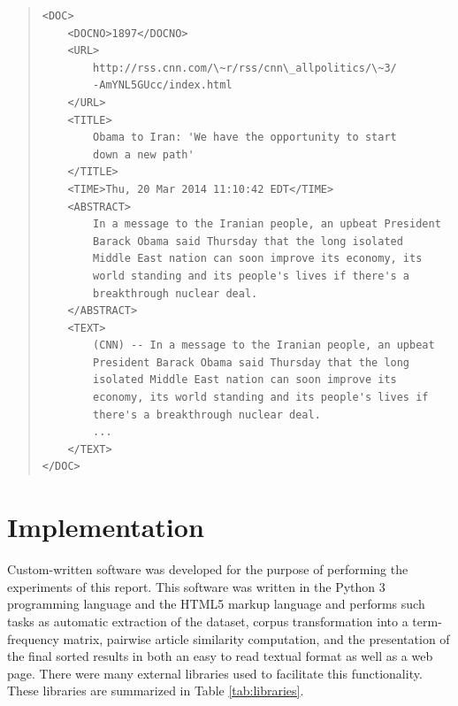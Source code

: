 \documentclass[11pt]{article}
\begin{document}
\small 
\begin{quote} \label{samplearticle}
\begin{verbatim}
<DOC>
    <DOCNO>1897</DOCNO>
    <URL>
        http://rss.cnn.com/\~r/rss/cnn\_allpolitics/\~3/
        -AmYNL5GUcc/index.html
    </URL>
    <TITLE>
        Obama to Iran: 'We have the opportunity to start
        down a new path'
    </TITLE>
    <TIME>Thu, 20 Mar 2014 11:10:42 EDT</TIME>
    <ABSTRACT>
        In a message to the Iranian people, an upbeat President
        Barack Obama said Thursday that the long isolated
        Middle East nation can soon improve its economy, its
        world standing and its people's lives if there's a
        breakthrough nuclear deal.
    </ABSTRACT>
    <TEXT>
        (CNN) -- In a message to the Iranian people, an upbeat
        President Barack Obama said Thursday that the long
        isolated Middle East nation can soon improve its
        economy, its world standing and its people's lives if
        there's a breakthrough nuclear deal.
        ...
    </TEXT>
</DOC>
\end{verbatim}
\end{quote}
\normalsize


\section{Implementation} \label{sec:software}

Custom-written software was developed for the purpose of performing the experiments of this report. This software was written in the Python 3 programming language and the HTML5 markup language and performs such tasks as automatic extraction of the dataset, corpus transformation into a term-frequency matrix, pairwise article similarity computation, and the presentation of the final sorted results in both an easy to read textual format as well as a web page.
There were many external libraries used to facilitate this functionality.
These libraries are summarized in Table \ref{tab:libraries}.
\end{document}
